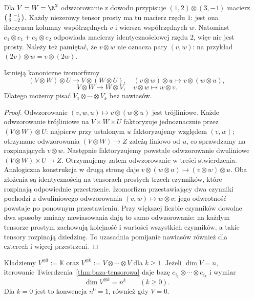 \begin{przyklad}
Dla $V=W=\R^2$ odwzorowanie z dowodu przypisuje
$(1,2)\otimes(3,-1)$ macierz
$\begin{psmallmatrix}3&-1\\6&-2\end{psmallmatrix}$.
Każdy niezerowy tensor prosty ma tu macierz rzędu $1$:
jest ona iloczynem kolumny współrzędnych $v$ i wiersza
współrzędnych $w$. Natomiast
$e_1\otimes e_1+e_2\otimes e_2$ odpowiada macierzy
identycznościowej rzędu $2$, więc nie jest prosty.
Należy też pamiętać, że $v\otimes w$ nie oznacza pary $(v,w)$:
na przykład $(2v)\otimes w=v\otimes(2w)$.
\end{przyklad}

\begin{stwierdzenie}
\label{prop:tensor-lacznosc}
Istnieją kanoniczne izomorfizmy
\[
 (V\otimes W)\otimes U\longrightarrow V\otimes(W\otimes U),
 \quad (v\otimes w)\otimes u\longmapsto v\otimes(w\otimes u),
\]
\[
 V\otimes W\longrightarrow W\otimes V,
 \quad v\otimes w\longmapsto w\otimes v.
\]
Dlatego możemy pisać $V_1\otimes\cdots\otimes V_k$ bez nawiasów.
\end{stwierdzenie}
\begin{proof}
Odwzorowanie $(v,w,u)\mapsto v\otimes(w\otimes u)$ jest
trójliniowe. Każde odwzorowanie trójliniowe na $V\times W\times U$
faktoryzuje jednoznacznie przez $(V\otimes W)\otimes U$:
najpierw przy ustalonym $u$ faktoryzujemy względem $(v,w)$;
otrzymane odwzorowania $(V\otimes W)\to Z$ zależą liniowo od $u$,
co sprawdzamy na rozpinających $v\otimes w$. Następnie
faktoryzujemy powstałe odwzorowanie dwuliniowe
$(V\otimes W)\times U\to Z$. Otrzymujemy zatem odwzorowanie w treści
stwierdzenia. Analogiczna konstrukcja w drugą stronę daje
$v\otimes(w\otimes u)\mapsto(v\otimes w)\otimes u$.
Oba złożenia są identycznością na tensorach prostych trzech
czynników, które rozpinają odpowiednie przestrzenie.
Izomorfizm przestawiający dwa czynniki pochodzi z dwuliniowego
odwzorowania $(v,w)\mapsto w\otimes v$; jego odwrotność powstaje
po ponownym przestawieniu.
Przy większej liczbie czynników dowolne dwa sposoby zmiany
nawiasowania dają to samo odwzorowanie: na każdym tensorze
prostym zachowują kolejność i wartości wszystkich czynników,
a takie tensory rozpinają dziedzinę. To uzasadnia pomijanie
nawiasów również dla czterech i więcej przestrzeni.
\end{proof}

Kładziemy $V^{\otimes0}:=\mathbb K$ oraz
$V^{\otimes k}:=V\otimes\cdots\otimes V$ dla $k\geq1$.
Jeżeli $\dim V=n$, iterowanie Twierdzenia~\ref{thm:baza-tensorowa}
daje bazę $e_{i_1}\otimes\cdots\otimes e_{i_k}$ i wymiar
\begin{equation}\label{eq:dim-potega-tensorowa}
 \dim V^{\otimes k}=n^k\qquad(k\geq0).
\end{equation}
Dla $k=0$ jest to konwencja $n^0=1$, również gdy $V=0$.

